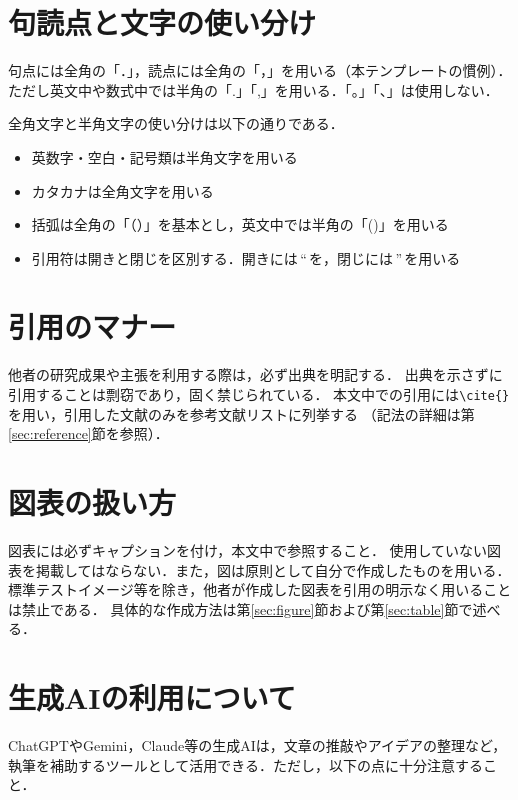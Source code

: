\section{句読点と文字の使い分け}
\label{sec:punctuation}
句点には全角の「．」，読点には全角の「，」を用いる（本テンプレートの慣例）．
ただし英文中や数式中では半角の「.」「,」を用いる．「。」「、」は使用しない．

全角文字と半角文字の使い分けは以下の通りである．
\begin{itemize}
    \item 英数字・空白・記号類は半角文字を用いる
    \item カタカナは全角文字を用いる
    \item 括弧は全角の「（）」を基本とし，英文中では半角の「()」を用いる
    \item 引用符は開きと閉じを区別する．開きには\,``\,を，閉じには\,''\,を用いる
\end{itemize}

\section{引用のマナー}
\label{sec:citation-manner}
他者の研究成果や主張を利用する際は，必ず出典を明記する．
出典を示さずに引用することは剽窃であり，固く禁じられている．
本文中での引用には\verb|\cite{}|を用い，引用した文献のみを参考文献リストに列挙する
（記法の詳細は第\ref{sec:reference}節を参照）．

\section{図表の扱い方}
\label{sec:figure-manner}
図表には必ずキャプションを付け，本文中で参照すること．
使用していない図表を掲載してはならない．また，図は原則として自分で作成したものを用いる．
標準テストイメージ等を除き，他者が作成した図表を引用の明示なく用いることは禁止である．
具体的な作成方法は第\ref{sec:figure}節および第\ref{sec:table}節で述べる．

\section{生成AIの利用について}
\label{sec:ai}
ChatGPTやGemini，Claude等の生成AIは，文章の推敲やアイデアの整理など，
執筆を補助するツールとして活用できる．ただし，以下の点に十分注意すること．


